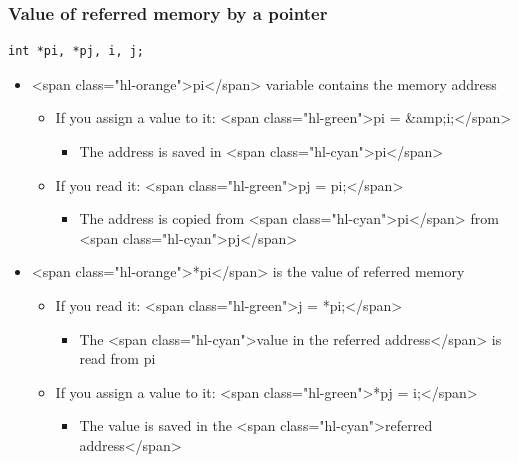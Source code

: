 \documentclass{../c-lecture}
\begin{document}
\begin{frame}[fragile]
  \frametitle{Value of referred memory by a pointer}
  \begin{verbatim}
int *pi, *pj, i, j;
  \end{verbatim}
  \begin{itemize}
    \item
      <span class="hl-orange">pi</span> variable contains the memory address

    \begin{itemize}
      \item
        If you assign a value to it:
        <span class="hl-green">pi = &amp;i;</span>

      \begin{itemize}
        \item The address is saved in <span class="hl-cyan">pi</span>
      \end{itemize}
      \item If you read it: <span class="hl-green">pj = pi;</span>
      \begin{itemize}
        \item
          The address is copied from <span class="hl-cyan">pi</span> from
          <span class="hl-cyan">pj</span>

      \end{itemize}
    \end{itemize}
  \end{itemize}
\end{frame}
\begin{frame}
  \begin{itemize}
    \item
      <span class="hl-orange">*pi</span> is the value of referred memory

    \begin{itemize}
      \item If you read it: <span class="hl-green">j = *pi;</span>
      \begin{itemize}
        \item
          The <span class="hl-cyan">value in the referred address</span> is
          read from pi

      \end{itemize}
      \item
        If you assign a value to it: <span class="hl-green">*pj = i;</span>

      \begin{itemize}
        \item
          The value is saved in the
          <span class="hl-cyan">referred address</span>

      \end{itemize}
    \end{itemize}
  \end{itemize}
\end{frame}
\end{document}
